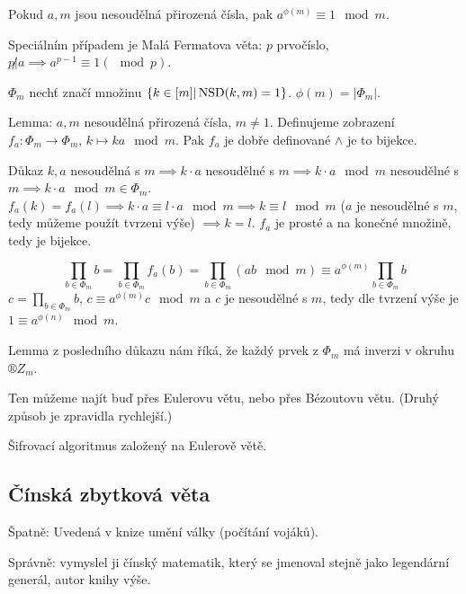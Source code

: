\documentclass[12pt]{article}                   %
\begin{document}
        \begin{veta}[Eulerova]
            Pokud $a, m$ jsou nesoudělná přirozená čísla, pak $a^{\phi(m)} ≡ 1 \mod m$.

            Speciálním případem je Malá Fermatova věta: $p$ prvočíslo, $p\not|a \implies a^{p-1}≡1(\mod p)$.

            \begin{dukazin}
                $\Phi_m$ nechť značí množinu $\{k \in [m]|\operatorname{NSD}(k, m) = 1\}$. $\phi(m) = |\Phi_m|$.

                Lemma: $a, m$ nesoudělná přirozená čísla, $m≠1$. Definujeme zobrazení $f_a: \Phi_m \rightarrow \Phi_m$, $k \mapsto ka \mod m$. Pak $f_a$ je dobře definované $\land$ je to bijekce.

                Důkaz $k, a$ nesoudělná s $m \implies k·a$ nesoudělné s $m \implies k·a \mod m$ nesoudělné s $m \implies k·a \mod m \in \Phi_m$. $f_a(k) = f_a(l) \implies k·a ≡ l·a \mod m \implies k≡l \mod m$ ($a$ je nesoudělné s $m$, tedy můžeme použít tvrzeni výše) $\implies k=l$. $f_a$ je prosté a na konečné množině, tedy je bijekce.

                $$ \prod_{b \in \Phi_m}b = \prod_{b \in \Phi_m} f_a(b) = \prod_{b \in \Phi_m} (ab \mod m) ≡ a^{\phi(m)} \prod_{b \in \Phi_m} b $$
                $c = \prod_{b \in \Phi_m} b$, $c ≡ a^{\phi(m)}c \mod m$ a $c$ je nesoudělné s $m$, tedy dle tvrzení výše je $1 ≡ a^{\phi(n)} \mod m$.
            \end{dukazin}
        \end{veta}

        \begin{poznamka}
            Lemma z posledního důkazu nám říká, že každý prvek z $\Phi_m$ má inverzi v okruhu $®Z_m$.

            Ten můžeme najít buď přes Eulerovu větu, nebo přes Bézoutovu větu. (Druhý způsob je zpravidla rychlejší.)
        \end{poznamka}


        \begin{poznamka}
            Šifrovací algoritmus založený na Eulerově větě.
        \end{poznamka}

    \subsection{Čínská zbytková věta}
        \begin{poznamka}
            Špatně: Uvedená v knize umění války (počítání vojáků).

            Správně: vymyslel ji čínský matematik, který se jmenoval stejně jako legendární generál, autor knihy výše.
        \end{poznamka}
\end{document}
